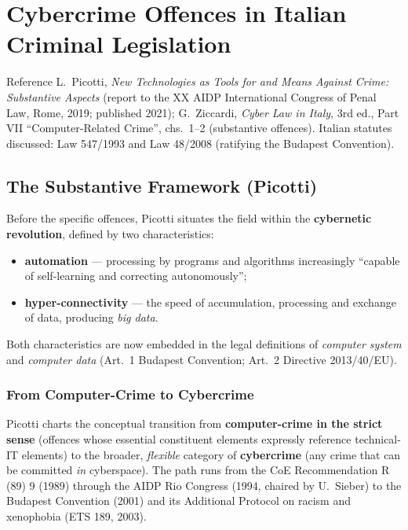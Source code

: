 \documentclass[11pt,a4paper,openany]{report}
\theoremstyle{definition}
\theoremstyle{plain}
\theoremstyle{remark}
\begin{document}
\chapter{Cybercrime Offences in Italian Criminal Legislation}
\label{chap:italian-offences}

\begin{sourcebox}{Reference}
L.\ Picotti, \textit{New Technologies as Tools for and Means Against Crime: Substantive Aspects} (report to the XX AIDP International Congress of Penal Law, Rome, 2019; published 2021); G.\ Ziccardi, \textit{Cyber Law in Italy}, 3rd ed., Part VII ``Computer-Related Crime'', chs.\ 1--2 (substantive offences). Italian statutes discussed: Law 547/1993 and Law 48/2008 (ratifying the Budapest Convention).
\end{sourcebox}

\section{The Substantive Framework (Picotti)}

Before the specific offences, Picotti situates the field within the \textbf{cybernetic revolution}, defined by two characteristics:
\begin{itemize}
    \item \textbf{automation} --- processing by programs and algorithms increasingly ``capable of self-learning and correcting autonomously'';
    \item \textbf{hyper-connectivity} --- the speed of accumulation, processing and exchange of data, producing \emph{big data}.
\end{itemize}
Both characteristics are now embedded in the legal definitions of \emph{computer system} and \emph{computer data} (Art.\ 1 Budapest Convention; Art.\ 2 Directive 2013/40/EU).

\subsection{From Computer-Crime to Cybercrime}

Picotti charts the conceptual transition from \textbf{computer-crime in the strict sense} (offences whose essential constituent elements expressly reference technical-IT elements) to the broader, \emph{flexible} category of \textbf{cybercrime} (any crime that can be committed \emph{in} cyberspace). The path runs from the CoE Recommendation R (89) 9 (1989) through the AIDP Rio Congress (1994, chaired by U.\ Sieber) to the Budapest Convention (2001) and its Additional Protocol on racism and xenophobia (ETS 189, 2003).
\end{document}
